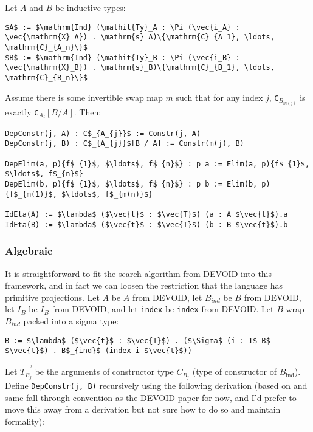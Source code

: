 Let $A$ and $B$ be inductive types:

\begin{lstlisting}
$A$ := $\mathrm{Ind} (\mathit{Ty}_A : \Pi (\vec{i_A} : \vec{\mathrm{X}_A}) . \mathrm{s}_A)\{\mathrm{C}_{A_1}, \ldots, \mathrm{C}_{A_n}\}$
$B$ := $\mathrm{Ind} (\mathit{Ty}_B : \Pi (\vec{i_B} : \vec{\mathrm{X}_B}) . \mathrm{s}_B)\{\mathrm{C}_{B_1}, \ldots, \mathrm{C}_{B_n}\}$
\end{lstlisting}		
Assume there is some invertible swap map $m$ such that for any index $j$,
\lstinline{C}$_{B_{m(j)}}$ is exactly \lstinline{C}$_{A_j}[B / A]$.
Then:

\begin{lstlisting}
DepConstr(j, A) : C$_{A_{j}}$ := Constr(j, A) 
DepConstr(j, B) : C$_{A_{j}}$[B / A] := Constr(m(j), B)

DepElim(a, p){f$_{1}$, $\ldots$, f$_{n}$} : p a := Elim(a, p){f$_{1}$, $\ldots$, f$_{n}$}
DepElim(b, p){f$_{1}$, $\ldots$, f$_{n}$} : p b := Elim(b, p){f$_{m(1)}$, $\ldots$, f$_{m(n)}$}

IdEta(A) := $\lambda$ ($\vec{t}$ : $\vec{T}$) (a : A $\vec{t}$).a
IdEta(B) := $\lambda$ ($\vec{t}$ : $\vec{T}$) (b : B $\vec{t}$).b
\end{lstlisting}

\subsubsection{Algebraic}

It is straightforward to fit the search algorithm from DEVOID into this framework, and in fact
we can loosen the restriction that the language has primitive projections.
Let $A$ be $A$ from DEVOID, let $B_{ind}$ be $B$ from DEVOID, let $I_B$ be $I_B$ from DEVOID,
and let \lstinline{index} be \lstinline{index} from DEVOID.
Let $B$ wrap $B_{ind}$ packed into a sigma type:

\begin{lstlisting}
B := $\lambda$ ($\vec{t}$ : $\vec{T}$) . ($\Sigma$ (i : I$_B$ $\vec{t}$) . B$_{ind}$ (index i $\vec{t}$))
\end{lstlisting}
Let $\vec{T_{B_j}}$ be the arguments of constructor type $C_{B_j}$ (type of constructor of $B_{\mathrm{ind}}$).
Define \lstinline{DepConstr(j, B)} recursively using the following derivation (based on and same fall-through convention as the DEVOID paper for now,
and I'd prefer to move this away from a derivation but not sure how to do so and maintain formality): %

